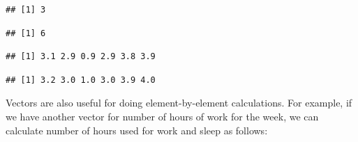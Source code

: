 \documentclass[10pt, letterpaper, twoside]{memoir}\usepackage{knitr}
\begin{document}
\begin{knitrout}
\color{fgcolor}\begin{kframe}
\begin{alltt}
\hlstd{grades[}\hlstd{]}  
\end{alltt}
\begin{verbatim}
## [1] 3
\end{verbatim}
\begin{alltt}
\hlstd{grades[}\hlstd{]} \hlkwb{<-}   
  
\end{alltt}
\begin{verbatim}
## [1] 6
\end{verbatim}
\begin{alltt}
 \hlopt{-}   
\end{alltt}
\begin{verbatim}
## [1] 3.1 2.9 0.9 2.9 3.8 3.9
\end{verbatim}
\begin{alltt}
  
\end{alltt}
\begin{verbatim}
## [1] 3.2 3.0 1.0 3.0 3.9 4.0
\end{verbatim}
\end{kframe}
\end{knitrout}

Vectors are also useful for doing element-by-element calculations. For example, if we have another vector for number of hours of work for the week, we can calculate number of hours used for work and sleep as follows:

\begin{knitrout}
\color{fgcolor}\begin{kframe}
\begin{alltt}
 \hlkwb{<-} \hlstd{(}\hlstd{,} \hlstd{,} \hlstd{,} \hlstd{,} \hlstd{,} \hlstd{,} \hlstd{)}  
\end{alltt}
\end{kframe}
\end{knitrout}
\end{document}
